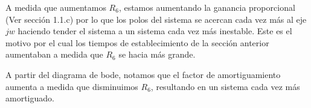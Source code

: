 \documentclass[e4_tp2_main.tex]{subfiles}
\begin{document}
  
A medida que aumentamos $R_6$, estamos aumentando la ganancia proporcional (Ver secci\'on 1.1.c) por lo que los polos del sistema se acercan cada vez m\'as al eje $jw$ haciendo tender el sistema a un sistema cada vez m\'as inestable. Este es el motivo por el cual los tiempos de establecimiento de la secci\'on anterior aumentaban a medida que $R_6$ se hacia m\'as grande. 

A partir del diagrama de bode, notamos que el factor de amortiguamiento aumenta a medida que disminuimos $R_6$, resultando en un sistema cada vez m\'as amortiguado.
\end{document}
